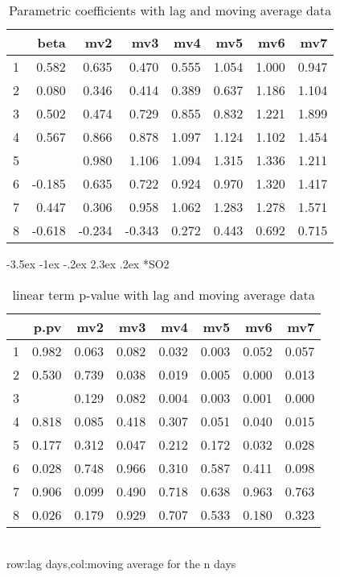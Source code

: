 \documentclass[a4paper, 12pt]{article}
\makeatletter
\def\large{\fontsize{14}{20}\selectfont}
\renewcommand\subsection{\@startsection {subsection}{1}{\z@}%
                                   {-3.5ex \@plus -1ex \@minus -.2ex}%
                                   {2.3ex \@plus.2ex}%
                                   {\centering\normalfont\large\bfseries}}
\makeatother
\begin{document}
\begin{table}[h]
\centering
\caption{Parametric coefficients with lag and moving average data}
\begin{tabular}{rrrrrrrr}
  \hline
 & beta & mv2 & mv3 & mv4 & mv5 & mv6 & mv7 \\
  \hline
1 & 0.582 & 0.635 & 0.470 & 0.555 & 1.054 & 1.000 & 0.947 \\
  2 & 0.080 & 0.346 & 0.414 & 0.389 & 0.637 & 1.186 & 1.104 \\
  3 & 0.502 & 0.474 & 0.729 & 0.855 & 0.832 & 1.221 & 1.899 \\
  4 & 0.567 & 0.866 & 0.878 & 1.097 & 1.124 & 1.102 & 1.454 \\
  5 & \color{red}{0.967} & 0.980 & 1.106 & 1.094 & 1.315 & 1.336 & 1.211 \\
  6 & -0.185 & 0.635 & 0.722 & 0.924 & 0.970 & 1.320 & 1.417 \\
  7 & 0.447 & 0.306 & 0.958 & 1.062 & 1.283 & 1.278 & 1.571 \\
  8 & -0.618 & -0.234 & -0.343 & 0.272 & 0.443 & 0.692 & 0.715 \\
   \hline
\end{tabular}
\end{table}
\clearpage
\subsection*{SO2}
\begin{table}[h]
\centering
\caption{linear term p-value with lag and moving average data}
\begin{tabular}{rrrrrrrr}
  \hline
 & p.pv & mv2 & mv3 & mv4 & mv5 & mv6 & mv7 \\
  \hline
1 & 0.982 & 0.063 & 0.082 & 0.032 & 0.003 & 0.052 & 0.057 \\
  2 & 0.530 & 0.739 & 0.038 & 0.019 & 0.005 & 0.000 & 0.013 \\
  3 & \color{red}{0.002} & 0.129 & 0.082 & 0.004 & 0.003 & 0.001 & 0.000 \\
  4 & 0.818 & 0.085 & 0.418 & 0.307 & 0.051 & 0.040 & 0.015 \\
  5 & 0.177 & 0.312 & 0.047 & 0.212 & 0.172 & 0.032 & 0.028 \\
  6 & 0.028 & 0.748 & 0.966 & 0.310 & 0.587 & 0.411 & 0.098 \\
  7 & 0.906 & 0.099 & 0.490 & 0.718 & 0.638 & 0.963 & 0.763 \\
  8 & 0.026 & 0.179 & 0.929 & 0.707 & 0.533 & 0.180 & 0.323 \\
   \hline
\end{tabular}
\\row:lag days,col:moving average for the n days
\end{table}
\end{document}
